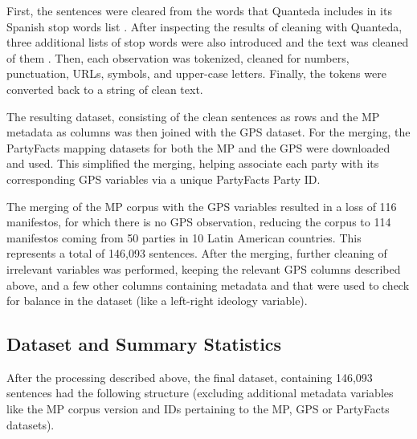 \documentclass[12pt,letterpaper]{article}
\begin{document}
First, the sentences were cleared from the words that Quanteda includes in its Spanish stop words list \autocite{benoitQuantedaPackageQuantitative2018}. After inspecting the results of cleaning with Quanteda, three additional lists of stop words were also introduced and the text was cleaned of them\autocite{rosellStopWordsTxtText2016}\autocite{diazStopwordsesTxtText2016}\autocite{matiasSpanishTxtText2021} . Then, each observation was tokenized, cleaned for numbers, punctuation, URLs, symbols, and upper-case letters. Finally, the tokens were converted back to a string of clean text. 

The resulting dataset, consisting of the clean sentences as rows and the MP metadata as columns was then joined with the GPS dataset. For the merging, the PartyFacts mapping datasets \autocite{holgerPartyFactsDatabase} for both the MP and the GPS were downloaded and used. This simplified the merging, helping associate each party with its corresponding GPS variables via a unique PartyFacts Party ID. 

The merging of the MP corpus with the GPS variables resulted in a loss of 116 manifestos, for which there is no GPS observation, reducing the corpus to 114 manifestos coming from 50 parties in 10 Latin American countries. This represents a total of 146,093 sentences. After the merging, further cleaning of irrelevant variables was performed, keeping the relevant GPS columns described above, and a few other columns containing metadata and that were used to check for balance in the dataset (like a left-right ideology variable). 

\vspace{.25cm}
\subsection{Dataset and Summary Statistics}

\vspace{.25cm}
After the processing described above, the final dataset, containing 146,093 sentences had the following structure (excluding additional metadata variables like the MP corpus version and IDs pertaining to the MP, GPS or PartyFacts datasets).  
\end{document}
